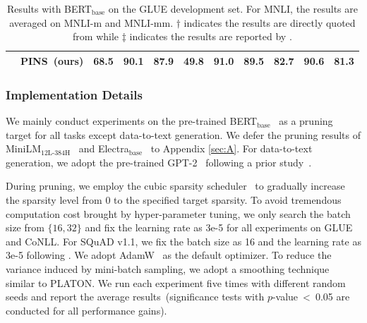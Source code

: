 \begin{table}[t]
\begin{tabular}{c|l|cccccccc|c}
		&PINS~(ours)                                             &  \textbf{68.5}                                                                                      & \textbf{90.1}                                                                              &\textbf{87.9}         & \textbf{49.8}                                                                                        &  \textbf{91.0}                                                                                        &  \textbf{89.5}                                                                                       &   \textbf{82.7}                                                                                      &  \textbf{90.6}                                   & \textbf{81.3}            \\
		\bottomrule                                     
	\end{tabular}
	\caption{Results with BERT$_{\text{base}}$ on the GLUE development set. For MNLI, the results are averaged on MNLI-m and MNLI-mm. $\dagger$ indicates the results are directly quoted from \citet{platon} while $\ddagger$ indicates the results are reported by \citet{pst}. }
	\label{table:glue}
\end{table}

\subsubsection{Implementation Details}
We mainly conduct experiments on the pre-trained BERT$_{\text{base}}$~\cite{bert} as a pruning target for all tasks except data-to-text generation. We defer the pruning results of MiniLM$_{\text{12L-384H}}$~\cite{minilm} and Electra$_{\text{base}}$~\cite{electra} to Appendix \ref{sec:A}. For data-to-text generation, we adopt the pre-trained GPT-2~\cite{gpt2} following 
a prior study~\cite{pst}.

During pruning, we employ the cubic sparsity scheduler~\cite{movement,platon} to gradually increase the sparsity level from 0 to the specified target sparsity. To avoid tremendous computation cost brought by hyper-parameter tuning, we only search the batch size from $\{16,32\}$ and fix the learning rate as 3e-5 for all experiments on GLUE and CoNLL. For SQuAD v1.1, we fix the batch size as 16 and the learning rate as 3e-5 following \citet{platon}. We adopt AdamW~\cite{adamw} as the default optimizer.
To reduce the variance induced by mini-batch sampling, we adopt a smoothing technique similar to PLATON. We run each experiment five times with different random seeds and report the average results~(significance tests with $p$-value~<~0.05 are conducted  for  all performance gains).

